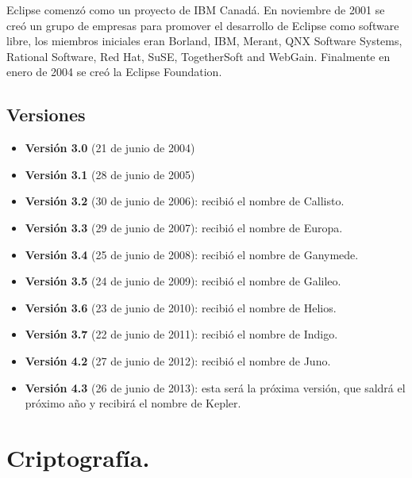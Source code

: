 Eclipse comenzó como un proyecto de IBM Canadá. En noviembre de 2001 se creó un grupo de empresas para promover el desarrollo de Eclipse como software libre, los miembros iniciales eran Borland, IBM, Merant, QNX Software Systems, Rational Software, Red Hat, SuSE, TogetherSoft and WebGain. Finalmente en enero de 2004 se creó la Eclipse Foundation. 

\subsection{Versiones}

\begin{itemize}

	\item \textbf{Versión 3.0} (21 de junio de 2004)
	
	\item \textbf{Versión 3.1} (28 de junio de 2005)
	
	\item \textbf{Versión 3.2} (30 de junio de 2006): recibió el nombre de Callisto.
	
	\item \textbf{Versión 3.3} (29 de junio de 2007): recibió el nombre de Europa.
	
	\item \textbf{Versión 3.4} (25 de junio de 2008): recibió el nombre de Ganymede.
	
	\item \textbf{Versión 3.5} (24 de junio de 2009): recibió el nombre de Galileo.
	
	\item \textbf{Versión 3.6} (23 de junio de 2010): recibió el nombre de Helios.
	
	\item \textbf{Versión 3.7} (22 de junio de 2011): recibió el nombre de Indigo.
	
	\item \textbf{Versión 4.2} (27 de junio de 2012): recibió el nombre de Juno.
	
	\item \textbf{Versión 4.3} (26 de junio de 2013): esta será la próxima versión, que saldrá el próximo año y recibirá el nombre de Kepler.

\end{itemize}

\section{Criptografía.}\label{lbl:criptografia}

